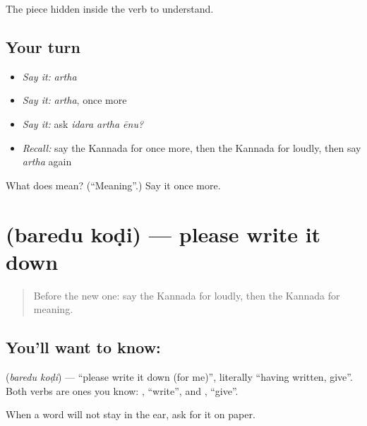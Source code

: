 \begin{grammarlens}[title={What you've built}]
The piece hidden inside the verb to understand.
\end{grammarlens}

\subsection*{Your turn}
\begin{itemize}
\raggedright
  \item \emph{Say it:} \emph{artha}
  \item \emph{Say it:} \emph{artha}, once more
  \item \emph{Say it:} ask \emph{idara artha ēnu?}
  \item \emph{Recall:} say the Kannada for once more, then the Kannada for loudly, then say \emph{artha} again
\end{itemize}

\begin{tcolorbox}[breakable,colback=teal!4,colframe=teal!35!black,title={Before you move on}]
What does  mean? (\textquotedblleft{}Meaning\textquotedblright{}.) Say it once more.
\end{tcolorbox}
\section[\texorpdfstring{\kn{ಬರೆದು} \kn{ಕೊಡಿ} (baredu koḍi)}{ಬರೆದು ಕೊಡಿ (baredu koḍi)}]{  (baredu koḍi) — please write it down}

\label{lesson:KA-C85-writeit}



\begin{quote}
Before the new one: say the Kannada for loudly, then the Kannada for meaning.
\end{quote}

\subsection*{You'll want to know:  }
\textbf{ } (\emph{baredu koḍi}) — \textquotedblleft{}please write it down (for me)\textquotedblright{}, literally \textquotedblleft{}having written, give\textquotedblright{}. Both verbs are ones you know: \textbf{}, \textquotedblleft{}write\textquotedblright{}, and \textbf{}, \textquotedblleft{}give\textquotedblright{}.

When a word will not stay in the ear, ask for it on paper.


